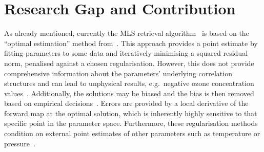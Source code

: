 \section{Research Gap and Contribution}

As already mentioned, currently the MLS retrieval algorithm~\cite{livesey2006retrieval} is based on the ``optimal estimation'' method from~\cite{rodgers1976retrieval}.
This approach provides a point estimate by fitting parameters to some data and iteratively minimising a squared residual norm, penalised against a chosen regularisation.
However, this does not provide comprehensive information about the parameters' underlying correlation structures and can lead to unphysical results, e.g.~negative ozone concentration values~\cite{MLSdata}.
Additionally, the solutions may be biased and the bias is then removed based on empirical decisions~\cite{livesey2008ozonecarbonmono, Froidevaux2008snrozone}.
Errors are provided by a local derivative of the forward map at the optimal solution, which is inherently highly sensitive to that specific point in the parameter space.
Furthermore, these regularisation methods condition on external point estimates of other parameters such as temperature or pressure~\cite{livesey2006retrieval}.


